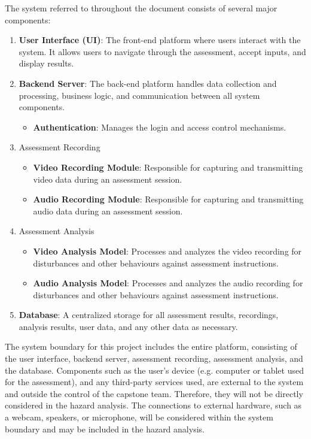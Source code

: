 \documentclass{article}
\begin{document}
The system referred to throughout the document consists of several major components: 
\begin{enumerate}
    \item \textbf{User Interface (UI)}: The front-end platform where users interact with the system. It allows users to navigate through the assessment, accept inputs, and display results.
    \item \textbf{Backend Server}: The back-end platform handles data collection and processing, business logic, and communication between all system components.
        \begin{itemize}
            \item \textbf{Authentication}: Manages the login and access control mechanisms.
        \end{itemize}
    \item Assessment Recording
        \begin{itemize}
            \item \textbf{Video Recording Module}: Responsible for capturing and transmitting video data during an assessment session.
            \item \textbf{Audio Recording Module}: Responsible for capturing and transmitting audio data during an assessment session.
        \end{itemize}
    \item Assessment Analysis
        \begin{itemize}
            \item \textbf{Video Analysis Model}: Processes and analyzes the video recording for disturbances and other behaviours against assessment instructions.
            \item \textbf{Audio Analysis Model}: Processes and analyzes the audio recording for disturbances and other behaviours against assessment instructions.
        \end{itemize}
    \item \textbf{Database}: A centralized storage for all assessment results, recordings, analysis results, user data, and any other data as necessary.
\end{enumerate}

The system boundary for this project includes the entire platform, consisting of the user interface, backend server, 
assessment recording, assessment analysis, and the database. Components such as the user's device (e.g. computer or 
tablet used for the assessment), and any third-party services used, are external to the system and outside the control of 
the capstone team. Therefore, they will not be directly considered in the hazard analysis. The connections to external hardware, such as a webcam, speakers, or microphone,
will be considered within the system boundary and may be included in the hazard analysis.
\end{document}
